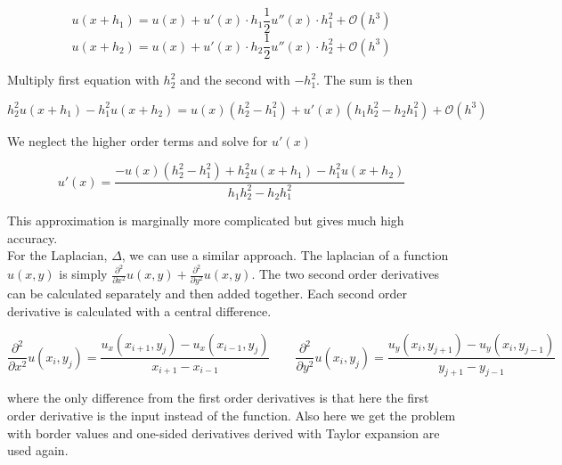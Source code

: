 \documentclass[paper=a4, fontsize=12pt]{article} %
\begin{document}
$$u(x+h_1) = u(x) + u'(x)\cdot h_1 \frac{1}{2}u''(x)\cdot h_1^2 + \mathcal{O}(h^3)$$
$$u(x+h_2) = u(x) + u'(x)\cdot h_2 \frac{1}{2}u''(x)\cdot h_2^2 + \mathcal{O}(h^3)$$

Multiply first equation with $h_2^2$ and the second with $-h_1^2$. The sum is then

$$ h_2^2 u(x+h_1)  - h_1^2 u(x+h_2)  = u(x) (h_2^2 - h_1^2 ) + u'(x) (h_1 h_2^2 - h_2 h_ 1^2) +  \mathcal{O}(h^3) $$

We neglect the higher order terms and solve for $u'(x)$

$$  u'(x) = \frac{- u(x) (h_2^2 - h_1^2 ) + h_2^2 u(x+h_1)  - h_1^2 u(x+h_2) }{h_1 h_2^2 - h_2 h_ 1^2}  $$

This approximation is marginally more complicated but gives much high accuracy. \\


For the Laplacian, $\Delta$, we can use a similar approach. The laplacian of a function $u(x,y) $ is simply $\frac{\partial^2}{\partial x^2} u(x,y) + \frac{\partial^2}{\partial y^2} u(x,y) $. The two second order derivatives can be calculated separately and then added together. Each second order derivative is calculated with a central difference. 

$$ \frac{\partial^2}{\partial x^2} u(x_i,y_j)  = \frac{u_x(x_{i+1},y_j)-u_x(x_{i-1},y_j)}{x_{i+1} - x_{i-1}} \qquad  \frac{\partial^2}{\partial y^2} u(x_i,y_j)  = \frac{u_y(x_{i},y_{j+1})-u_y(x_{i},y_{j-1})}{y_{j+1} - y_{j-1}}$$ 

where the only difference from the first order derivatives is that here the first order derivative is the input instead of the function. Also here we get the problem with border values and one-sided derivatives derived with Taylor expansion are used again.






% 
%
%
%
%
%
\end{document}
